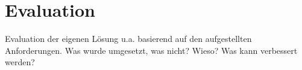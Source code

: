 \chapter{Evaluation}
\label{sec:evaluation}

Evaluation der eigenen Lösung u.a. basierend auf den aufgestellten Anforderungen. Was wurde umgesetzt, was nicht? Wieso? Was kann verbessert werden?
